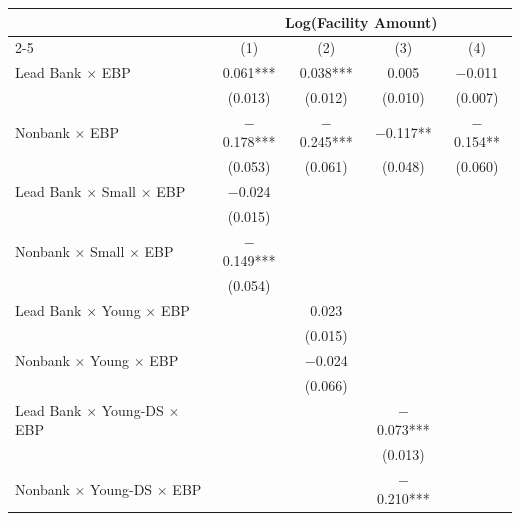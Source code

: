 {
\def\sym#1{\ifmmode^{#1}\else\(^{#1}\)\fi}
\begin{tabular}{l*{4}{c}}
\toprule\toprule
                                        &\multicolumn{4}{c}{Log(Facility Amount)}                       \\\cmidrule(lr){2-5}
                                        &\multicolumn{1}{c}{(1)}   &\multicolumn{1}{c}{(2)}   &\multicolumn{1}{c}{(3)}   &\multicolumn{1}{c}{(4)}   \\
\toprule
Lead Bank $\times$ EBP                  &       0.061***&       0.038***&       0.005   &    $-$0.011   \\
                                        &     (0.013)   &     (0.012)   &     (0.010)   &     (0.007)   \\
[1em]
Nonbank $\times$ EBP                    &    $-$0.178***&    $-$0.245***&    $-$0.117** &    $-$0.154** \\
                                        &     (0.053)   &     (0.061)   &     (0.048)   &     (0.060)   \\
[1em]
Lead Bank $\times$ Small $\times$ EBP   &    $-$0.024   &               &               &               \\
                                        &     (0.015)   &               &               &               \\
[1em]
Nonbank $\times$ Small $\times$ EBP     &    $-$0.149***&               &               &               \\
                                        &     (0.054)   &               &               &               \\
[1em]
Lead Bank $\times$ Young $\times$ EBP   &               &       0.023   &               &               \\
                                        &               &     (0.015)   &               &               \\
[1em]
Nonbank $\times$ Young $\times$ EBP     &               &    $-$0.024   &               &               \\
                                        &               &     (0.066)   &               &               \\
[1em]
Lead Bank $\times$ Young-DS $\times$ EBP&               &               &    $-$0.073***&               \\
                                        &               &               &     (0.013)   &               \\
[1em]
Nonbank $\times$ Young-DS $\times$ EBP  &               &               &    $-$0.210***&               \\

\end{tabular}}
